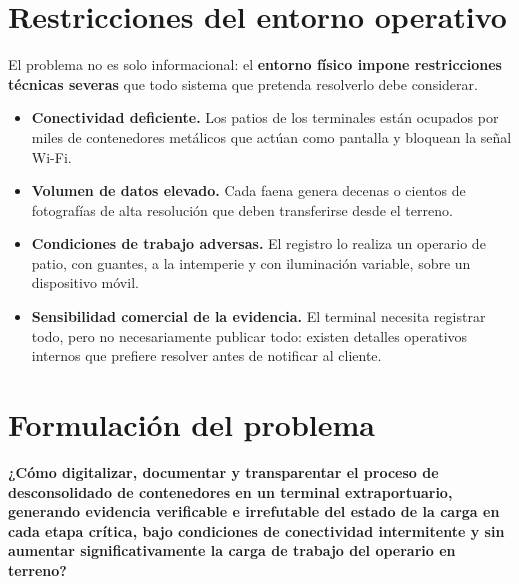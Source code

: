 \section{Restricciones del entorno operativo}
\label{sec:restricciones}

El problema no es solo informacional: el \textbf{entorno físico impone restricciones técnicas
severas} que todo sistema que pretenda resolverlo debe considerar.

\begin{itemize}
    \item \textbf{Conectividad deficiente.} Los patios de los terminales están ocupados por miles
          de contenedores metálicos que actúan como pantalla y bloquean la señal Wi-Fi.
    \item \textbf{Volumen de datos elevado.} Cada faena genera decenas o cientos de fotografías de
          alta resolución que deben transferirse desde el terreno.
    \item \textbf{Condiciones de trabajo adversas.} El registro lo realiza un operario de patio,
          con guantes, a la intemperie y con iluminación variable, sobre un dispositivo móvil.
    \item \textbf{Sensibilidad comercial de la evidencia.} El terminal necesita registrar todo,
          pero no necesariamente publicar todo: existen detalles operativos internos que prefiere
          resolver antes de notificar al cliente.
\end{itemize}

\section{Formulación del problema}
\label{sec:formulacion}

\begin{nota}
\textbf{¿Cómo digitalizar, documentar y transparentar el proceso de desconsolidado de contenedores
en un terminal extraportuario, generando evidencia verificable e irrefutable del estado de la carga
en cada etapa crítica, bajo condiciones de conectividad intermitente y sin aumentar
significativamente la carga de trabajo del operario en terreno?}
\end{nota}
